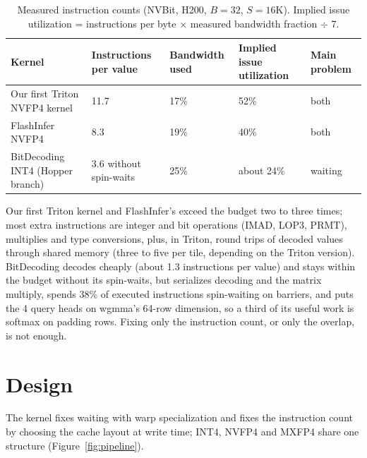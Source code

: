 \documentclass[11pt]{article}
\begin{document}
\begin{table}[tbp]
\centering
\caption{Measured instruction counts (NVBit, H200, $B = 32$, $S = 16$K). Implied issue utilization = instructions per byte $\times$ measured bandwidth fraction $\div$ 7.}
\label{tab:nvbit}
\small
\begin{tabularx}{\linewidth}{@{}Lllll@{}}
\toprule
Kernel & Instructions per value & Bandwidth used & Implied issue utilization & Main problem \\
\midrule
Our first Triton NVFP4 kernel & 11.7 & 17\% & 52\% & both \\
FlashInfer NVFP4 & 8.3 & 19\% & 40\% & both \\
BitDecoding INT4 (Hopper branch) & 3.6 without spin-waits & 25\% & about 24\% & waiting \\
\bottomrule
\end{tabularx}
\end{table}

Our first Triton kernel and FlashInfer's exceed the budget two to three times; most extra instructions are integer and bit operations (IMAD, LOP3, PRMT), multiplies and type conversions, plus, in Triton, round trips of decoded values through shared memory (three to five per tile, depending on the Triton version). BitDecoding decodes cheaply (about 1.3 instructions per value) and stays within the budget without its spin-waits, but serializes decoding and the matrix multiply, spends 38\% of executed instructions spin-waiting on barriers, and puts the 4 query heads on wgmma's 64-row dimension, so a third of its useful work is softmax on padding rows. Fixing only the instruction count, or only the overlap, is not enough.

\section{Design}
\label{sec:design}

The kernel fixes waiting with warp specialization and fixes the instruction count by choosing the cache layout at write time; INT4, NVFP4 and MXFP4 share one structure (Figure~\ref{fig:pipeline}).
\end{document}
